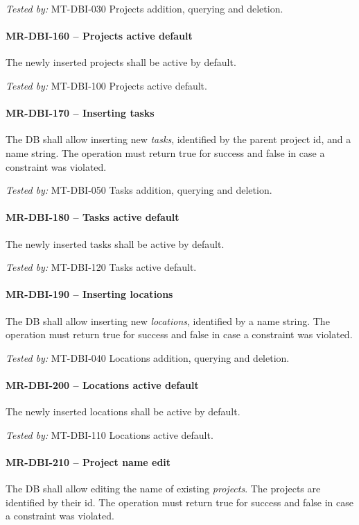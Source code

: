 \textit{Tested by: } MT-DBI-030 Projects addition, querying and deletion.

\paragraph{MR-DBI-160 -- Projects active default}
The newly inserted projects shall be active by default.

\textit{Tested by: } MT-DBI-100 Projects active default.

\paragraph{MR-DBI-170 -- Inserting tasks}
The \gls{DB} shall allow inserting new \emph{tasks}, identified by the parent
project id, and a name string. The operation must return true for success
and false in case a constraint was violated.

\textit{Tested by: } MT-DBI-050 Tasks addition, querying and deletion.

\paragraph{MR-DBI-180 -- Tasks active default}
The newly inserted tasks shall be active by default.

\textit{Tested by: } MT-DBI-120 Tasks active default.

\paragraph{MR-DBI-190 -- Inserting locations}
The \gls{DB} shall allow inserting new \emph{locations}, identified by a name
string. The operation must return true for success and false in case a
constraint was violated.

\textit{Tested by: } MT-DBI-040 Locations addition, querying and deletion.

\paragraph{MR-DBI-200 -- Locations active default}
The newly inserted locations shall be active by default.

\textit{Tested by: } MT-DBI-110 Locations active default.

\paragraph{MR-DBI-210 -- Project name edit}
The \gls{DB} shall allow editing the name of existing \emph{projects}.
The projects are identified by their id. The operation must return true for
success and false in case a constraint was violated.

